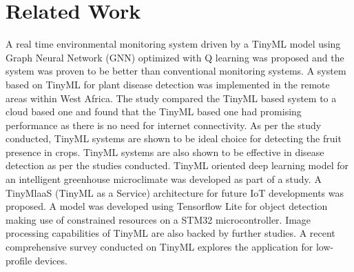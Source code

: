 \documentclass[fleqn,10pt]{wlscirep}
\begin{document}


\section*{Related Work}
\label{sec:relatedwork}




A real time environmental monitoring system driven by a TinyML model using Graph Neural Network (GNN) optimized with Q learning was proposed\cite{ieee00gnn}
and the system was proven to be better than conventional monitoring systems.
A system based on TinyML for plant disease detection was implemented in the remote areas within West Africa\cite{ieee01africa}. The
study compared the TinyML based system to a cloud based one and found that the TinyML based one had promising performance as
there is no need for internet connectivity.
As per the study\cite{ieee03} conducted, TinyML systems are shown to be ideal choice for detecting the fruit presence in crops.
TinyML systems are also shown to be effective in disease detection as per the studies\cite{sd00, ieee01africa} conducted.
TinyML oriented deep learning model for an intelligent greenhouse microclimate was developed as part of a study\cite{sp02}.
A TinyMlaaS (TinyML as a Service) architecture for future IoT developments was proposed\cite{ieee05}.
A model was developed using Tensorflow Lite for object detection making use of constrained resources on a STM32 microcontroller\cite{sd02}.
Image processing capabilities of TinyML are also backed by further studies\cite{sd03}.
A recent comprehensive survey\cite{ieee06} conducted on TinyML explores the application for low-profile devices.
\end{document}
